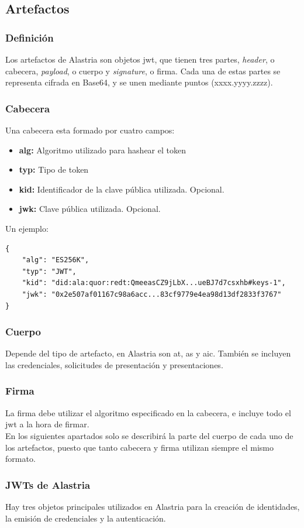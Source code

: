 \subsection{Artefactos}
\subsubsection{Definición}
Los artefactos de Alastria son objetos \acrshort{jwt}, que tienen tres partes, \textit{header}, o cabecera, \textit{payload}, o cuerpo y \textit{signature}, o firma.
Cada una de estas partes se representa cifrada en Base64, y se unen mediante puntos (xxxx.yyyy.zzzz).
\subsubsection*{Cabecera}
Una cabecera esta formado por cuatro campos:
\begin{itemize}
    \item \textbf{alg:} Algoritmo utilizado para hashear el token
    \item \textbf{typ:} Tipo de token
    \item \textbf{kid:} Identificador de la clave pública utilizada. Opcional.
    \item \textbf{jwk:} Clave pública utilizada. Opcional.
\end{itemize}
Un ejemplo:
\begin{verbatim}
{
    "alg": "ES256K",
    "typ": "JWT",
    "kid": "did:ala:quor:redt:QmeeasCZ9jLbX...ueBJ7d7csxhb#keys-1",
    "jwk": "0x2e507af01167c98a6acc...83cf9779e4ea98d13df2833f3767"
}
\end{verbatim}
\subsubsection*{Cuerpo}
Depende del tipo de artefacto, en Alastria son \acrshort{at}, \acrshort{as} y \acrshort{aic}. También se incluyen las credenciales, solicitudes de presentación y presentaciones.
\subsubsection*{Firma}
La firma debe utilizar el algoritmo especificado en la cabecera, e incluye todo el \acrshort{jwt} a la hora de firmar.\\

En los siguientes apartados solo se describirá la parte del cuerpo de cada uno de los artefactos, puesto que tanto cabecera y firma utilizan siempre el mismo formato.
\subsubsection{JWTs de Alastria}
Hay tres objetos principales \cite{alastria-artifacts} utilizados en Alastria para la creación de identidades, la emisión de credenciales y la autenticación.
